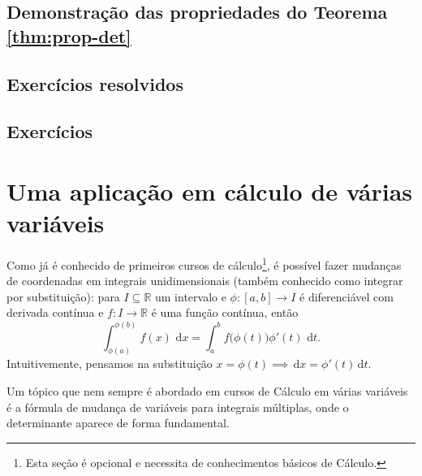 \subsection{Demonstração das propriedades do Teorema \ref*{thm:prop-det}}

\emconstrucao

\subsection*{Exercícios resolvidos}

\construirExeresol

\subsection*{Exercícios}

\construirExer


\section{Uma aplicação em cálculo de várias variáveis}

Como já é conhecido de primeiros cursos de cálculo\footnote{Esta seção é opcional e necessita de conhecimentos básicos de Cálculo.}, é possível fazer mudanças de coordenadas em integrais unidimensionais (também conhecido como integrar por substituição): para $I \subseteq \mathbb{R}$ um intervalo e $\phi : [a,b] \to I$ é diferenciável com derivada contínua e $f: I \to \mathbb{R}$ é uma função contínua, então
\begin{equation}
\int_{\phi (a)}^{\phi (b)} f(x) \, \, \mathrm{d} x = \int_{a}^{b} f \big(\phi (t)\big) \phi'(t) \, \, \mathrm{d} t.
\end{equation} Intuitivemente, pensamos na substituição $x = \phi (t) \implies \, \mathrm{d} x = \phi' (t)\, \mathrm{d} t$.

Um tópico que nem sempre é abordado em cursos de Cálculo em várias variáveis é a fórmula de mudança de variáveis para integrais múltiplas, onde o determinante aparece de forma fundamental.

